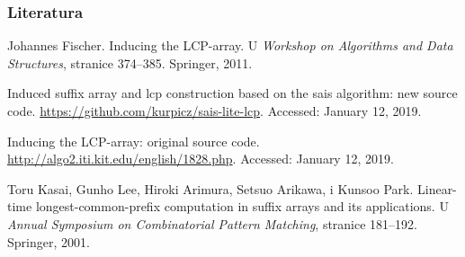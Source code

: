 \documentclass{beamer}
\begin{document}
\begin{frame}
\frametitle{Literatura}
\footnotesize{
\begin{thebibliography}{99}%
Johannes Fischer.
\newblock Inducing the LCP-array.
\newblock U \emph{Workshop on Algorithms and Data Structures}, stranice
  374--385. Springer, 2011.
  
Induced suffix array and lcp construction based on the sais algorithm: new
  source code.
\newblock \url{https://github.com/kurpicz/sais-lite-lcp}.
\newblock Accessed: January 12, 2019.

Inducing the {LCP}-array: original source code.
\newblock \url{http://algo2.iti.kit.edu/english/1828.php}.
\newblock Accessed: January 12, 2019.

Toru Kasai, Gunho Lee, Hiroki Arimura, Setsuo Arikawa, i Kunsoo Park.
\newblock Linear-time longest-common-prefix computation in suffix arrays and
  its applications.
\newblock U \emph{Annual Symposium on Combinatorial Pattern Matching}, stranice
  181--192. Springer, 2001.
\end{thebibliography}
}
\end{frame}
\end{document}
